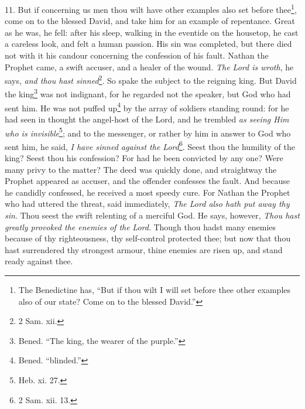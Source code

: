 11. But if concerning us men thou wilt have other examples also set before thee\footnote{The Benedictine has, “But if thou wilt I will set before thee other examples also of our state? Come on to the blessed David.”}, come on to the blessed David, and take him for an example of repentance. Great as he was, he fell: after his sleep, walking in the eventide on the housetop, he cast a careless look, and felt a human passion. His sin was completed, but there died not with it his candour concerning the confession of his fault. Nathan the Prophet came, a swift accuser, and a healer of the wound. \emph{The Lord is wroth}, he says, \emph{and thou hast sinned}\footnote{2 Sam. xii.}. So spake the subject to the reigning king. But David the king\footnote{Bened. “The king, the wearer of the purple.”} was not indignant, for he regarded not the speaker, but God who had sent him. He was not puffed up\footnote{Bened. “blinded.”} by the array of soldiers standing round: for he had seen in thought the angel-host of the Lord, and he trembled \emph{as seeing Him who is invisible}\footnote{Heb. xi. 27.}; and to the messenger, or rather by him in answer to God who sent him, he said, \emph{I have sinned against the Lord}\footnote{2 Sam. xii. 13.}. Seest thou the humility of the king? Seest thou his confession? For had he been convicted by any one? Were many privy to the matter? The deed was quickly done, and straightway the Prophet appeared as accuser, and the offender confesses the fault. And because he candidly confessed, he received a most speedy cure. For Nathan the Prophet who had uttered the threat, said immediately, \emph{The Lord also hath put away thy sin}. Thou seest the swift relenting of a merciful God. He says, however, \emph{Thou hast greatly provoked the enemies of the} \emph{Lord}. Though thou hadst many enemies because of thy righteousness, thy self-control protected thee; but now that thou hast surrendered thy strongest armour, thine enemies are risen up, and stand ready against thee.

